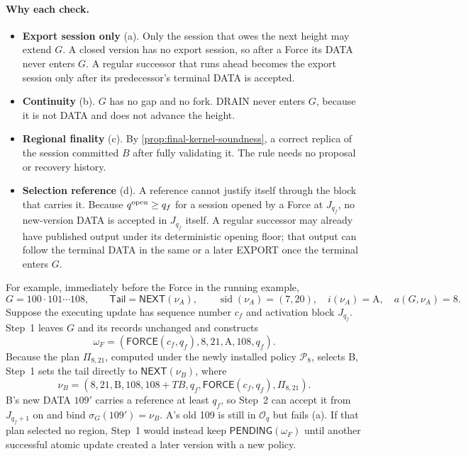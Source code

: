 \documentclass[11pt,a4paper]{article}
\newcommand{\TB}{\mathit{TB}}
\newcommand{\tagg}[1]{\ensuremath{\mathsf{#1}}}
\begin{document}
\paragraph{Why each check.}
\begin{itemize}[itemsep=2pt]
\item \textbf{Export session only} (a). Only the session that owes the
next height may extend $G$. A closed version has no export session, so
after a Force its DATA never enters $G$. A regular successor that runs
ahead becomes the export session only after its predecessor's terminal
DATA is accepted.
\item \textbf{Continuity} (b). $G$ has no gap and no fork. DRAIN never
enters $G$, because it is not DATA and does not advance the height.
\item \textbf{Regional finality} (c). By
\cref{prop:final-kernel-soundness}, a correct replica of the session
committed $B$ after fully validating it. The rule needs no proposal or
recovery history.
\item \textbf{Selection reference} (d). A reference cannot justify itself
through the block that carries it. Because $q^{\rm open}\ge q_f$ for a
session opened by a Force at $J_{q_f}$, no new-version DATA is accepted
in $J_{q_f}$ itself.  A regular successor may already have published
output under its deterministic opening floor; that output can follow the
terminal DATA in the same or a later EXPORT once the terminal enters
$G$.
\end{itemize}


For example, immediately before the Force in the running example,
\[
 G=100\cdot101\cdots108,\qquad
 \mathsf{Tail}=\tagg{NEXT}(\nu_A),\qquad
 \operatorname{sid}(\nu_A)=(7,20),\quad i(\nu_A)=\text{A},\quad
 a(G,\nu_A)=8.
\]
Suppose the executing update has sequence number $c_f$ and activation
block $J_{q_f}$. Step~1 leaves $G$ and its records unchanged and
constructs
\[
 \omega_F=(\tagg{FORCE}(c_f,q_f),8,21,\text{A},108,q_f).
\]
Because the plan $\Pi_{8,21}$, computed under the newly installed policy
$\mathcal P_8$, selects B, Step~1 sets the tail directly to
$\tagg{NEXT}(\nu_B)$, where
\[
 \nu_B=(8,21,\text{B},108,108+\TB,q_f,
        \tagg{FORCE}(c_f,q_f),\Pi_{8,21}).
\]
B's new DATA $109'$ carries a reference at least $q_f$, so Step~2 can
accept it from $J_{q_f+1}$ on and bind
$\sigma_G(109')=\nu_B$. A's old 109 is still in $\mathcal O_q$ but
fails (a). If that plan selected no region, Step~1 would instead
keep $\tagg{PENDING}(\omega_F)$ until another successful atomic update
created a later version with a new policy.
\end{document}
